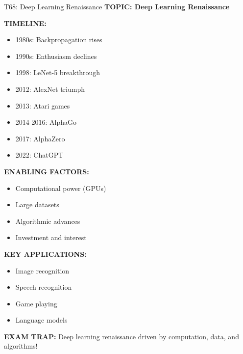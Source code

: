 \documentclass[8pt]{beamer}
\begin{document}
	\begin{frame}{T68: Deep Learning Renaissance}
		\fontsize{6.5}{7.5}\selectfont
		\textbf{TOPIC: Deep Learning Renaissance}
		
		\vspace{0.1cm}
		\textbf{TIMELINE:}
		\begin{itemize}
			\item 1980s: Backpropagation rises
			\item 1990s: Enthusiasm declines
			\item 1998: LeNet-5 breakthrough
			\item 2012: AlexNet triumph
			\item 2013: Atari games
			\item 2014-2016: AlphaGo
			\item 2017: AlphaZero
			\item 2022: ChatGPT
		\end{itemize}
		
		\vspace{0.1cm}
		\textbf{ENABLING FACTORS:}
		\begin{itemize}
			\item Computational power (GPUs)
			\item Large datasets
			\item Algorithmic advances
			\item Investment and interest
		\end{itemize}
		
		\vspace{0.1cm}
		\textbf{KEY APPLICATIONS:}
		\begin{itemize}
			\item Image recognition
			\item Speech recognition
			\item Game playing
			\item Language models
		\end{itemize}
		
		\textcolor{myred}{\textbf{EXAM TRAP:}} Deep learning renaissance driven by \textcolor{myblue}{computation, data, and algorithms}!
	\end{frame}
	
\end{document}
